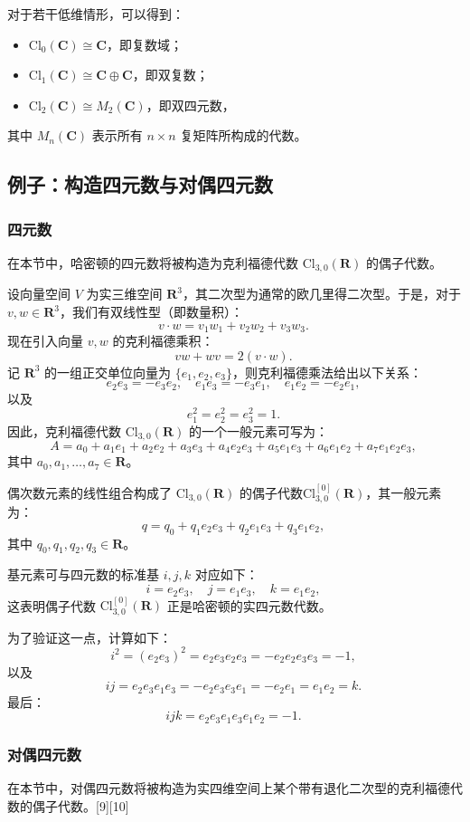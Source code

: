 对于若干低维情形，可以得到：
\begin{itemize}
\item $\mathrm{Cl}_0(\mathbf{C}) \cong \mathbf{C}$，即复数域；
\item $\mathrm{Cl}_1(\mathbf{C}) \cong \mathbf{C} \oplus \mathbf{C}$，即双复数；
\item $\mathrm{Cl}_2(\mathbf{C}) \cong M_2(\mathbf{C})$，即双四元数，
\end{itemize}
其中 $M_n(\mathbf{C})$ 表示所有 $n \times n$ 复矩阵所构成的代数。
\subsection{例子：构造四元数与对偶四元数}
\subsubsection{四元数}
在本节中，哈密顿的四元数将被构造为克利福德代数 $\mathrm{Cl}_{3,0}(\mathbf{R})$ 的偶子代数。

设向量空间 $V$ 为实三维空间 $\mathbf{R}^3$，其二次型为通常的欧几里得二次型。于是，对于 $v, w \in \mathbf{R}^3$，我们有双线性型（即数量积）：
$$
v \cdot w = v_1 w_1 + v_2 w_2 + v_3 w_3.~
$$
现在引入向量 $v, w$ 的克利福德乘积：
$$
vw + wv = 2 (v \cdot w).~
$$
记 $\mathbf{R}^3$ 的一组正交单位向量为 $\{e_1, e_2, e_3\}$，则克利福德乘法给出以下关系：
$$
e_2 e_3 = - e_3 e_2, \quad 
e_1 e_3 = - e_3 e_1, \quad 
e_1 e_2 = - e_2 e_1,~
$$
以及
$$
e_1^2 = e_2^2 = e_3^2 = 1.~
$$
因此，克利福德代数 $\mathrm{Cl}_{3,0}(\mathbf{R})$ 的一个一般元素可写为：
$$
A = a_0 + a_1 e_1 + a_2 e_2 + a_3 e_3 + a_4 e_2 e_3 + a_5 e_1 e_3 + a_6 e_1 e_2 + a_7 e_1 e_2 e_3,~
$$
其中 $a_0, a_1, \ldots, a_7 \in \mathbf{R}$。

偶次数元素的线性组合构成了 $\mathrm{Cl}_{3,0}(\mathbf{R})$ 的偶子代数$\mathrm{Cl}^{[0]}_{3,0}(\mathbf{R})$，其一般元素为：
$$
q = q_0 + q_1 e_2 e_3 + q_2 e_1 e_3 + q_3 e_1 e_2,~
$$
其中 $q_0, q_1, q_2, q_3 \in \mathbf{R}$。

基元素可与四元数的标准基 $i, j, k$ 对应如下：
$$
i = e_2 e_3, \quad j = e_1 e_3, \quad k = e_1 e_2,~
$$
这表明偶子代数 $\mathrm{Cl}^{[0]}_{3,0}(\mathbf{R})$ 正是哈密顿的实四元数代数。

为了验证这一点，计算如下：
$$
i^2 = (e_2 e_3)^2 = e_2 e_3 e_2 e_3 = - e_2 e_2 e_3 e_3 = -1,~
$$
以及
$$
ij = e_2 e_3 e_1 e_3 = - e_2 e_3 e_3 e_1 = - e_2 e_1 = e_1 e_2 = k.~
$$
最后：
$$
ijk = e_2 e_3 e_1 e_3 e_1 e_2 = -1.~
$$
\subsubsection{对偶四元数}
在本节中，对偶四元数将被构造为实四维空间上某个带有退化二次型的克利福德代数的偶子代数。[9][10]

